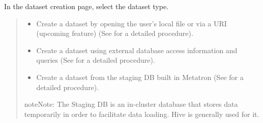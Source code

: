 \documentclass[letterpaper,10pt,english]{sphinxmanual}
\begin{document}
In the dataset creation page, select the dataset type.
\begin{quote}

\begin{figure}[H]
\centering

\noindent{}
\end{figure}
\begin{itemize}
\item {} 
 Create a dataset by opening the user’s local file or via a URI (upcoming feature) (See {\hyperref[\detokenize{discovery/part07/create_a_dataset:create-a-dataset-of-file}]{}} for a detailed procedure).

\item {} 
 Create a dataset using external database access information and queries (See {\hyperref[\detokenize{discovery/part07/create_a_dataset:create-a-dataset-of-database}]{}} for a detailed procedure).

\item {} 
 Create a dataset from the staging DB built in Metatron (See {\hyperref[\detokenize{discovery/part07/create_a_dataset:create-a-dataset-of-stagingdb}]{}} for a detailed procedure).

\end{itemize}

\begin{sphinxadmonition}{note}{Note:}
The Staging DB is an in-cluster database that stores data temporarily in order to facilitate data loading. Hive is generally used for it.
\end{sphinxadmonition}
\end{quote}
\end{document}
